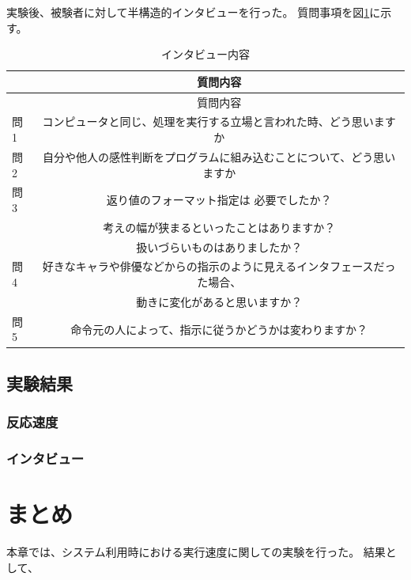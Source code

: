 実験後、被験者に対して半構造的インタビューを行った。
質問事項を図\ref{table:interview}に示す。

\begin{longtable}[c]{@{}lc@{}}
\caption{インタビュー内容 \label{table:interview}}\tabularnewline
\toprule
& 質問内容\tabularnewline
\midrule
\endfirsthead
\toprule
& 質問内容\tabularnewline
\midrule
\endhead
問1 &
コンピュータと同じ、処理を実行する立場と言われた時、どう思いますか\tabularnewline
問2 &
自分や他人の感性判断をプログラムに組み込むことについて、どう思いますか\tabularnewline
問3 & 返り値のフォーマット指定は 必要でしたか？ \tabularnewline
& 考えの幅が狭まるといったことはありますか？ \tabularnewline
& 扱いづらいものはありましたか？\tabularnewline
問4 &
好きなキャラや俳優などからの指示のように見えるインタフェースだった場合、\tabularnewline
& 動きに変化があると思いますか？\tabularnewline
問5 &
命令元の人によって、指示に従うかどうかは変わりますか？\tabularnewline
\bottomrule
\end{longtable}

\subsection{実験結果}\label{ux5b9fux9a13ux7d50ux679c}

\subsubsection{反応速度}\label{ux53cdux5fdcux901fux5ea6}

\subsubsection{インタビュー}\label{ux30a4ux30f3ux30bfux30d3ux30e5ux30fc}

\section{まとめ}\label{ux307eux3068ux3081}

本章では、システム利用時における実行速度に関しての実験を行った。
結果として、

